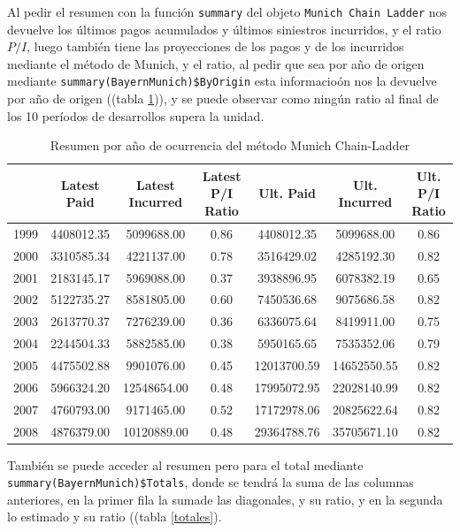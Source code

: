 \documentclass[
  12pt,
]{article}
\begin{document}
Al pedir el resumen con la función \texttt{summary} del objeto
\texttt{Munich Chain Ladder} nos devuelve los últimos pagos acumulados y
últimos siniestros incurridos, y el ratio \(P/I\), luego también tiene
las proyecciones de los pagos y de los incurridos mediante el método de
Munich, y el ratio, al pedir que sea por año de origen mediante
\texttt{summary(BayernMunich)\$ByOrigin} esta informacioón nos la
devuelve por año de origen ((tabla \ref{origin Munich})), y se puede
observar como ningún ratio al final de los 10 períodos de desarrollos
supera la unidad.

\begin{table}[ht]
\centering
\caption{Resumen por año de ocurrencia del método Munich Chain-Ladder} 
\label{origin Munich}
\begingroup\fontsize{10pt}{10pt}\selectfont
\begin{tabular}{ccccccc}
  \hline
 & Latest Paid & Latest Incurred & Latest P/I Ratio & Ult. Paid & Ult. Incurred & Ult. P/I Ratio \\ 
  \hline
1999 & 4408012.35 & 5099688.00 & 0.86 & 4408012.35 & 5099688.00 & 0.86 \\ 
  2000 & 3310585.34 & 4221137.00 & 0.78 & 3516429.02 & 4285192.30 & 0.82 \\ 
  2001 & 2183145.17 & 5969088.00 & 0.37 & 3938896.95 & 6078382.19 & 0.65 \\ 
  2002 & 5122735.27 & 8581805.00 & 0.60 & 7450536.68 & 9075686.58 & 0.82 \\ 
  2003 & 2613770.37 & 7276239.00 & 0.36 & 6336075.64 & 8419911.00 & 0.75 \\ 
  2004 & 2244504.33 & 5882585.00 & 0.38 & 5950165.65 & 7535352.06 & 0.79 \\ 
  2005 & 4475502.88 & 9901076.00 & 0.45 & 12013700.59 & 14652550.55 & 0.82 \\ 
  2006 & 5966324.20 & 12548654.00 & 0.48 & 17995072.95 & 22028140.99 & 0.82 \\ 
  2007 & 4760793.00 & 9171465.00 & 0.52 & 17172978.06 & 20825622.64 & 0.82 \\ 
  2008 & 4876379.00 & 10120889.00 & 0.48 & 29364788.76 & 35705671.10 & 0.82 \\ 
   \hline
\end{tabular}
\endgroup
\end{table}

También se puede acceder al resumen pero para el total mediante
\texttt{summary(BayernMunich)\$Totals}, donde se tendrá la suma de las
columnas anteriores, en la primer fila la sumade las diagonales, y su
ratio, y en la segunda lo estimado y su ratio ((tabla \ref{totales}).
\end{document}
